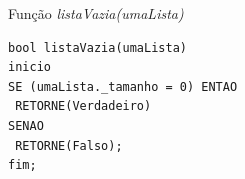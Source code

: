 \documentclass[12pt,table,xcolor={dvipsnames}]{beamer}
\begin{document}
\begin{frame}[fragile]{Função \textit{listaVazia(umaLista)}}
\begin{lstlisting}
bool listaVazia(umaLista)
inicio
SE (umaLista._tamanho = 0) ENTAO
 RETORNE(Verdadeiro)
SENAO
 RETORNE(Falso);
fim;
\end{lstlisting}
\end{frame}
\end{document}
